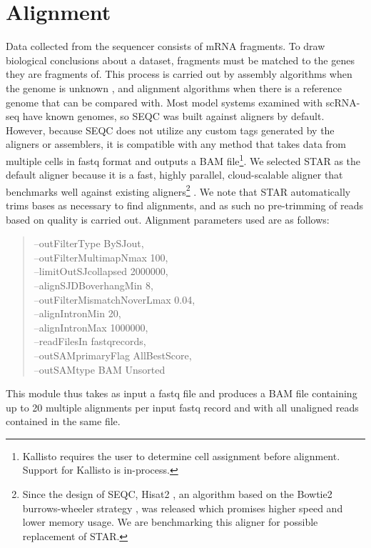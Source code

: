 \section{Alignment} %

Data collected from the sequencer consists of mRNA fragments.
To draw biological conclusions about a dataset, fragments must be matched to the genes they are fragments of. 
This process is carried out by assembly algorithms when the genome is unknown \citep{Haas2013}, and alignment algorithms when there is a reference genome that can be compared with.
Most model systems examined with scRNA-seq have known genomes, so SEQC was built against aligners by default.
However, because SEQC does not utilize any custom tags generated by the aligners or assemblers, it is compatible with any method that takes data from multiple cells in fastq format and outputs a BAM file\footnote{Kallisto requires the user to determine cell assignment before alignment. Support for Kallisto is in-process.}.
We selected STAR as the default aligner because it is a fast, highly parallel, cloud-scalable aligner that benchmarks well against existing aligners\footnote{Since the design of SEQC, Hisat2 \citep{Kim2015}, an algorithm based on the Bowtie2 burrows-wheeler strategy \citep{Langmead2012}, was released which promises higher speed and lower memory usage. We are benchmarking this aligner for possible replacement of STAR.} \citep{Ilicic2016}. 
We note that STAR automatically trims bases as necessary to find alignments, and as such no pre-trimming of reads based on quality is carried out. 
Alignment parameters used are as follows: 
\begin{quote}
\onehalfspacing
{\mono
--outFilterType BySJout,\\ 
--outFilterMultimapNmax 100,\\
--limitOutSJcollapsed 2000000,\\
--alignSJDBoverhangMin 8,\\
--outFilterMismatchNoverLmax 0.04,\\
--alignIntronMin 20,\\
--alignIntronMax 1000000,\\
--readFilesIn fastqrecords,\\
--outSAMprimaryFlag AllBestScore,\\
--outSAMtype BAM Unsorted
}
\end{quote}
This module thus takes as input a fastq file and produces a BAM file containing up to 20 multiple alignments per input fastq record and with all unaligned reads contained in the same file. 

